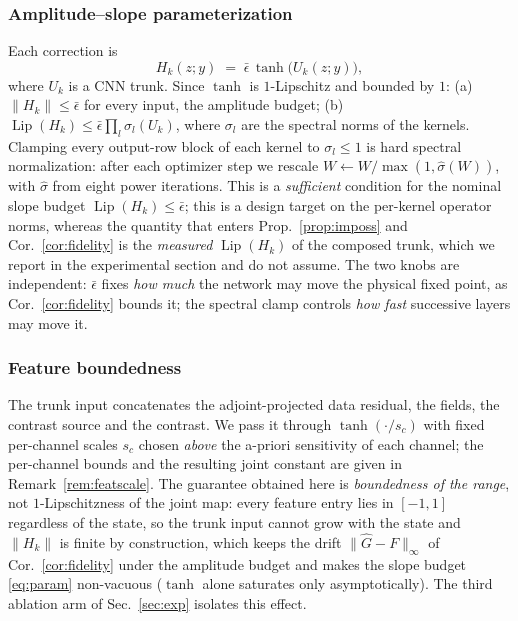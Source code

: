 \documentclass[journal,cmes,article,submit,moreauthors,pdftex]{Definitions/tsp}
\newcommand{\norm}[1]{\lVert #1 \rVert}
\begin{document}
\subsubsection{Amplitude--slope parameterization}
Each correction is
\begin{equation}\label{eq:param}
H_k(z;y) \;=\; \bar\epsilon\,\tanh\!\big(U_k(z;y)\big),
\end{equation}
where $U_k$ is a CNN trunk. Since $\tanh$ is $1$-Lipschitz and bounded by $1$:
(a) $\norm{H_k}\le\bar\epsilon$ for every input, the amplitude budget;
(b) $\operatorname{Lip}(H_k)\le\bar\epsilon\prod_l\sigma_l(U_k)$, where $\sigma_l$ are the
spectral norms of the kernels. Clamping every output-row block of each kernel to $\sigma_l\le1$ is hard spectral normalization: after each optimizer step we rescale $W\leftarrow W/\max(1,\hat\sigma(W))$, with $\hat\sigma$ from eight power iterations. This is a \emph{sufficient} condition for the nominal slope budget
$\operatorname{Lip}(H_k)\le\bar\epsilon$; this is a design target on the per-kernel
operator norms, whereas the quantity that enters Prop.~\ref{prop:imposs} and
Cor.~\ref{cor:fidelity} is the \emph{measured} $\operatorname{Lip}(H_k)$ of the composed trunk,
which we report in the experimental section and do not assume. The two knobs are independent:
$\bar\epsilon$ fixes \emph{how much} the network may move the physical fixed point, as Cor.~\ref{cor:fidelity} bounds it; the spectral clamp controls \emph{how fast} successive layers may move
it.

\subsubsection{Feature boundedness}
The trunk input concatenates the adjoint-projected data residual, the fields, the contrast source
and the contrast. We pass it through $\tanh(\cdot/s_c)$ with fixed per-channel scales $s_c$ chosen
\emph{above} the a-priori sensitivity of each channel; the per-channel bounds and the resulting
joint constant are given in Remark~\ref{rem:featscale}. The guarantee obtained here is
\emph{boundedness of the range}, not $1$-Lipschitzness of the joint map: every feature entry lies in
$[-1,1]$ regardless of the state, so the trunk input cannot grow with the state and $\norm{H_k}$ is
finite by construction, which keeps the drift $\norm{\hat G-F}_\infty$ of
Cor.~\ref{cor:fidelity} under the amplitude budget and makes the slope budget \eqref{eq:param}
non-vacuous ($\tanh$ alone saturates only asymptotically). The third ablation arm of Sec.~\ref{sec:exp} isolates this effect.
\end{document}
